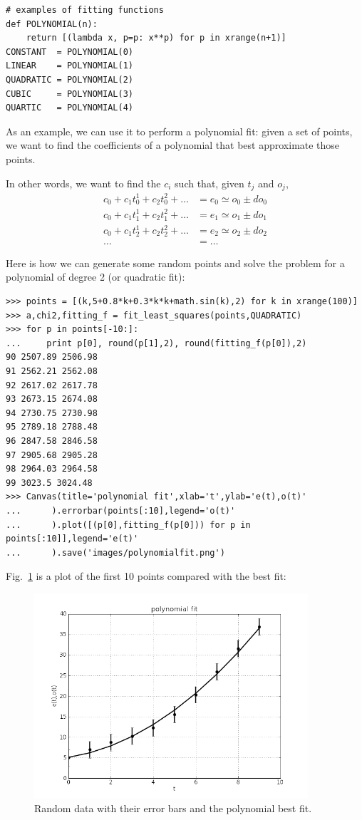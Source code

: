 \documentclass[justified,sixbynine]{tufte-book}
\def\ft{\small\tt}
\theoremstyle{plain}%
\theoremstyle{definition}
\theoremstyle{remark}
\begin{document}
\begin{fullwidth}
\begin{lstlisting}[caption={in file: {\ft nlib.py}}]
# examples of fitting functions
def POLYNOMIAL(n):
    return [(lambda x, p=p: x**p) for p in xrange(n+1)]
CONSTANT  = POLYNOMIAL(0)
LINEAR    = POLYNOMIAL(1)
QUADRATIC = POLYNOMIAL(2)
CUBIC     = POLYNOMIAL(3)
QUARTIC   = POLYNOMIAL(4)
\end{lstlisting}

As an example, we can use it to perform a polynomial fit: given a set of points, we want to find the coefficients of a polynomial that best approximate those points.

In other words, we want to find the $c_i$ such that, given $t_j$ and $o_j$,
\begin{align}
c_0  + c_1 t_0^{1} + c_2 t_0^{2} +  \dots &= e_0 \simeq o_0 \pm do_0 \\
c_0  + c_1 t_1^{1} + c_2 t_1^{2} +  \dots &= e_1 \simeq o_1 \pm do_1\\
c_0  + c_1 t_2^{1} + c_2 t_2^{2} +  \dots &= e_2 \simeq o_2 \pm do_2\\
\dots &= \dots 
\end{align}

Here is how we can generate some random points and solve the problem for a polynomial of degree 2 (or quadratic fit):

\begin{lstlisting}[caption={in file: {\ft nlib.py}}]
>>> points = [(k,5+0.8*k+0.3*k*k+math.sin(k),2) for k in xrange(100)]
>>> a,chi2,fitting_f = fit_least_squares(points,QUADRATIC)
>>> for p in points[-10:]:
...     print p[0], round(p[1],2), round(fitting_f(p[0]),2)
90 2507.89 2506.98
91 2562.21 2562.08
92 2617.02 2617.78
93 2673.15 2674.08
94 2730.75 2730.98
95 2789.18 2788.48
96 2847.58 2846.58
97 2905.68 2905.28
98 2964.03 2964.58
99 3023.5 3024.48
>>> Canvas(title='polynomial fit',xlab='t',ylab='e(t),o(t)'
...      ).errorbar(points[:10],legend='o(t)'
...      ).plot([(p[0],fitting_f(p[0])) for p in points[:10]],legend='e(t)'
...      ).save('images/polynomialfit.png')
\end{lstlisting}

Fig.~\ref{fit} is a plot of the first 10 points compared with the best fit:

\begin{figure}[ht]
\centering\includegraphics[width=4in]{images/polynomialfit.png}
\caption{Random data with their error bars and the polynomial best fit.\label{fit}}
\end{figure}


\end{fullwidth}
\end{document}

